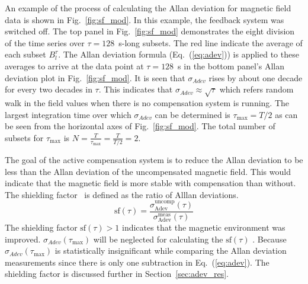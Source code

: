 An example of the process of calculating the Allan deviation for magnetic field data is shown in Fig.~\ref{fig:sf_mod}. In this example, the feedback system was switched off. The top panel in Fig.~\ref{fig:sf_mod} demonstrates the eight division of the time series over $\tau=128$~s-long subsets. The red line indicate the average of each subset $B_l^{\tau}$. The Allan deviation formula (Eq.~(\ref{eq:adev})) is applied to these averages to arrive at the data point at $\tau=128$~s in the bottom panel's Allan deviation plot in Fig.~\ref{fig:sf_mod}.  It is seen that $\sigma_{Adev}$ rises by about one decade for every two decades in $\tau$. This indicates that $\sigma_{Adev}\approx \sqrt{\tau}$ which refers random walk in the field values when there is no compensation system is running. The largest integration time over which $\sigma_{Adev}$ can be determined is $\tau_{\text{max}}=T/2$ as can be seen from the horizontal axes of Fig.~\ref{fig:sf_mod}. The total number of subsets for $\tau_{\text{max}}$ is $N = \frac{T}{\tau_{\text{max}}}=\frac{T}{T/2}=2$. 






The goal of the active compensation system is to reduce the Allan deviation to be less than the Allan deviation of the uncompensated magnetic field. This would indicate that the magnetic field is more stable with compensation than without. The shielding factor~\cite{bea} is defined as the ratio of Alllan deviations.
\begin{equation}\label{eq:sf}
    \text{sf} (\tau)=\frac{\sigma_{\text{Adev}}^{\text{uncomp}}(\tau)}{\sigma_{\text{Adev}}^{\text{meas}}(\tau)}
\end{equation}
The shielding factor $\text{sf} (\tau)>1$ indicates that the magnetic environment was improved. $\sigma_{Adev}(\tau_{\text{max}})$ will be neglected for calculating the $\text{sf} (\tau)$ . Because $\sigma_{Adev}(\tau_{\text{max}})$ is statistically insignificant while comparing the Allan deviation measurements since there is only one subtraction in Eq.~(\ref{eq:adev}). The shielding factor is discussed further in Section~\ref{sec:adev_res}.
 

 
 
 

